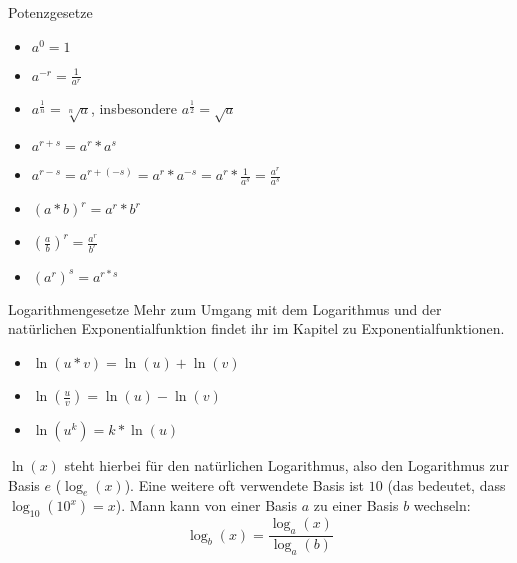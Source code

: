 \begin{bla}{Potenzgesetze}
  \begin{itemize}
    \item $a^0=1$
    \item $a^{-r}=\frac{1}{a^r}$
    \item $a^{\frac{1}{n}}=\sqrt[n]{a}$, insbesondere $a^{\frac{1}{2}}=\sqrt{a}$
    \item $a^{r+s}=a^r*a^s$
    \item $a^{r-s}=a^{r+(-s)}=a^r*a^{-s}=a^r*\frac{1}{a^s}=\frac{a^r}{a^s}$
    \item ${(a*b)}^r=a^r*b^r$
    \item ${(\frac{a}{b})}^r=\frac{a^r}{b^r}$
    \item ${(a^r)}^s=a^{r*s}$
  \end{itemize}
\end{bla}

\begin{bla}{Logarithmengesetze}
  Mehr zum Umgang mit dem Logarithmus und der natürlichen Exponentialfunktion findet ihr im Kapitel zu Exponentialfunktionen.
  \begin{itemize}
    \item $\ln(u*v)=\ln(u)+\ln(v)$
    \item $\ln(\frac{u}{v})=\ln(u)-\ln(v)$
    \item $\ln(u^k)=k*\ln(u)$
  \end{itemize}
  $\ln(x)$ steht hierbei für den natürlichen Logarithmus, also den Logarithmus zur Basis $e$ ($\log_e(x)$). Eine weitere oft verwendete Basis ist $10$ (das bedeutet, dass $\log_{10}(10^x)=x$). Mann kann von einer Basis $a$ zu einer Basis $b$ wechseln:
  \begin{equation*}
    \log_b(x)=\frac{\log_a(x)}{\log_a(b)}
  \end{equation*}
\end{bla}
